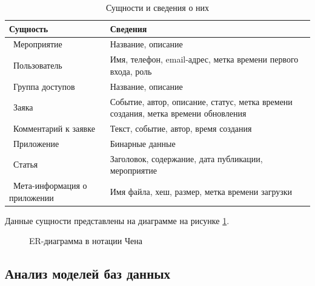 \begin{table}[ht!]
	\centering
	\caption{Сущности и сведения о них}
	\label{decisions}
	\begin{tabular}{|p{4.3cm}|p{10.3cm}|}
		\hline
		\textbf{Сущность} & \textbf{Сведения}\\
		\hline 
		\ Мероприятие & Название, описание \\
		\hline 
		\ Пользователь &  Имя, телефон, email-адрес, метка времени первого входа, роль \\
		\hline 
		\ Группа доступов & Название, описание \\
		\hline 
		\ Заяка & Событие, автор, описание, статус, метка времени создания, метка времени обновления\\
		\hline 
		\ Комментарий к заявке & Текст, событие, автор, время создания \\
		\hline 
		\ Приложение & Бинарные данные \\
		\hline 
		\ Статья & Заголовок, содержание, дата публикации, мероприятие \\
		\hline 
		\ Мета-информация о приложении & Имя файла, хеш, размер, метка времени загрузки \\
		\hline
	\end{tabular}
\end{table}

Данные сущности представлены на диаграмме на рисунке \ref{fig:chen}.

\begin{figure}[h!]
	\caption{ER-диаграмма в нотации Чена}
	\label{fig:chen}
\end{figure}

\subsection{Анализ моделей баз данных}

